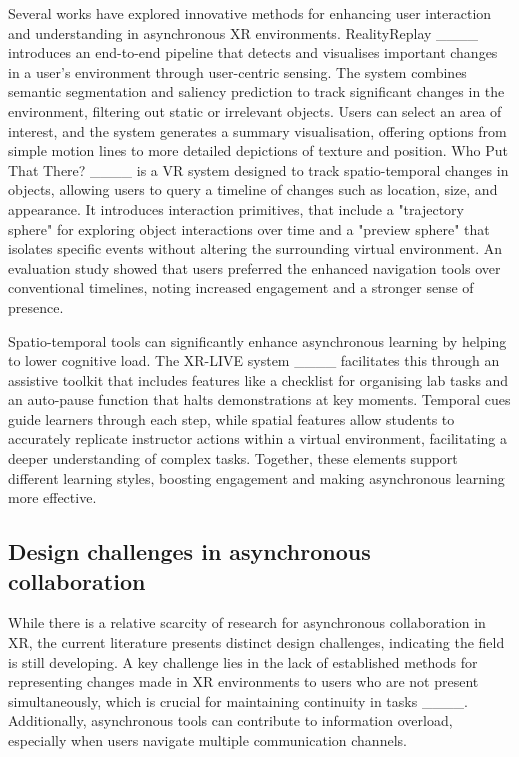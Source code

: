 Several works have explored innovative methods for enhancing user interaction and understanding in asynchronous XR environments. RealityReplay ____ introduces an end-to-end pipeline that detects and visualises important changes in a user's environment through user-centric sensing. The system combines semantic segmentation and saliency prediction to track significant changes in the environment, filtering out static or irrelevant objects. Users can select an area of interest, and the system generates a summary visualisation, offering options from simple motion lines to more detailed depictions of texture and position. Who Put That There? ____ is a VR system designed to track spatio-temporal changes in objects, allowing users to query a timeline of changes such as location, size, and appearance. It introduces interaction primitives, that include a "trajectory sphere" for exploring object interactions over time and a "preview sphere" that isolates specific events without altering the surrounding virtual environment. An evaluation study showed that users preferred the enhanced navigation tools over conventional timelines, noting increased engagement and a stronger sense of presence.

Spatio-temporal tools can significantly enhance asynchronous learning by helping to lower cognitive load. The XR-LIVE system ____ facilitates this through an assistive toolkit that includes features like a checklist for organising lab tasks and an auto-pause function that halts demonstrations at key moments. Temporal cues guide learners through each step, while spatial features allow students to accurately replicate instructor actions within a virtual environment, facilitating a deeper understanding of complex tasks. Together, these elements support different learning styles, boosting engagement and making asynchronous learning more effective.

\subsection{Design challenges in asynchronous collaboration}

While there is a relative scarcity of research for asynchronous collaboration in XR, the current literature presents distinct design challenges, indicating the field is still developing. A key challenge lies in the lack of established methods for representing changes made in XR environments to users who are not present simultaneously, which is crucial for maintaining continuity in tasks ____. Additionally, asynchronous tools can contribute to information overload, especially when users navigate multiple communication channels. 

